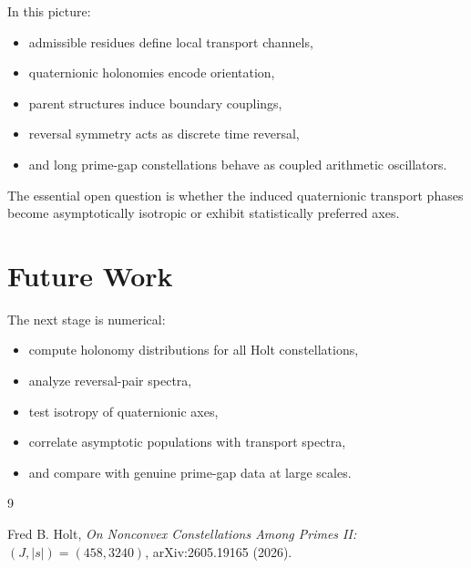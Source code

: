 \documentclass[11pt]{article}
\begin{document}
	In this picture:
	\begin{itemize}
		\item admissible residues define local transport channels,
		\item quaternionic holonomies encode orientation,
		\item parent structures induce boundary couplings,
		\item reversal symmetry acts as discrete time reversal,
		\item and long prime-gap constellations behave as coupled arithmetic oscillators.
	\end{itemize}
	
	The essential open question is whether the induced quaternionic transport phases become asymptotically isotropic or exhibit statistically preferred axes.
	
	\section{Future Work}
	
	The next stage is numerical:
	\begin{itemize}
		\item compute holonomy distributions for all Holt constellations,
		\item analyze reversal-pair spectra,
		\item test isotropy of quaternionic axes,
		\item correlate asymptotic populations with transport spectra,
		\item and compare with genuine prime-gap data at large scales.
	\end{itemize}
	
	\begin{thebibliography}{9}
		
		Fred B. Holt,
		\textit{On Nonconvex Constellations Among Primes II: $(J,|s|)=(458,3240)$},
		arXiv:2605.19165 (2026).
		
	\end{thebibliography}
	
\end{document}
